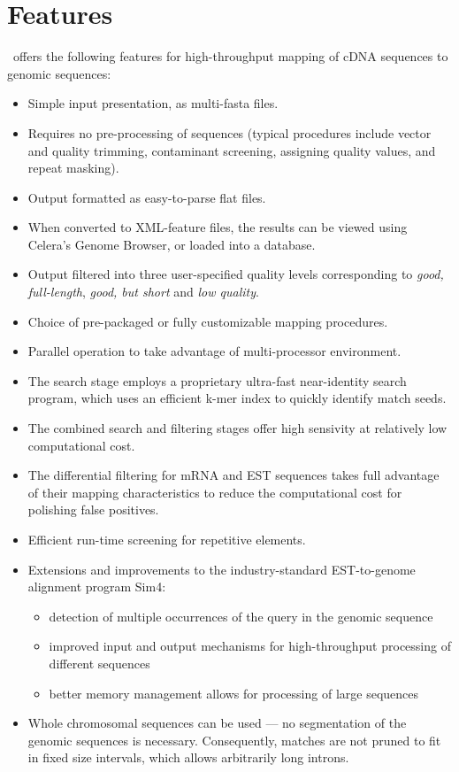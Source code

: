\documentclass[twoside,11pt]{book}
\begin{document}
\section{Features}

\ESTmapper\ offers the following features for high-throughput mapping
of cDNA sequences to genomic sequences:
\begin{itemize}
\item Simple input presentation, as multi-fasta files.
\item Requires no pre-processing of sequences (typical procedures
include vector and quality trimming, contaminant screening, assigning
quality values, and repeat masking).
\item Output formatted as easy-to-parse flat files.
\item When converted to XML-feature files, the results can be viewed
using Celera's Genome Browser, or loaded into a database.
\item Output filtered into three user-specified quality levels
corresponding to {\it good, full-length}, {\it good, but short} and
{\it low quality}.
\item Choice of pre-packaged or fully customizable mapping procedures.
\item Parallel operation to take advantage of multi-processor environment.
\item The search stage employs a proprietary ultra-fast near-identity
search program, which uses an efficient k-mer index to quickly
identify match seeds.
\item The combined search and filtering stages offer high sensivity at
relatively low computational cost.
\item The differential filtering for mRNA and EST sequences takes full
advantage of their mapping characteristics to reduce the computational
cost for polishing false positives.
\item Efficient run-time screening for repetitive elements.
\item Extensions and improvements to the industry-standard EST-to-genome
alignment program Sim4:
\begin{itemize}
\item detection of multiple occurrences of the query in the genomic sequence
\item improved input and output mechanisms for high-throughput processing 
of different sequences
\item better memory management allows for processing of large sequences
\end{itemize}
\item Whole chromosomal sequences can be used --- no segmentation of
the genomic sequences is necessary.  Consequently, matches are not
pruned to fit in fixed size intervals, which allows arbitrarily long
introns.
\end{itemize}
\end{document}
